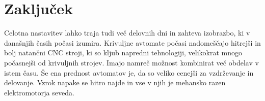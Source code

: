 \newpage
\section{Zaključek}
Celotna nastavitev lahko traja tudi več delovnih dni in zahteva 
izobrazbo, ki v današnjih časih počasi izumira. Krivuljne avtomate 
počasi nadomeščajo hitrejši in bolj natančni CNC stroji, ki so kljub 
napredni tehnologiji, velikokrat mnogo počasnejši od krivuljnih strojev. 
Imajo namreč možnost kombinirat več obdelav v istem času. Še ena prednost avtomatov je, da so veliko cenejši 
za vzdrževanje in delovanje. Vzrok napake se hitro najde in vse v njih je 
mehansko razen elektromotorja seveda.

